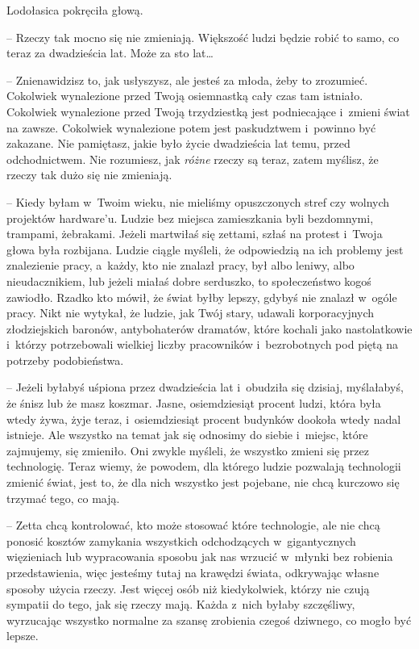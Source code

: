 \documentclass[oneside,polish,11pt,sfheadings]{mwbk}
\begin{document}
Lodołasica pokręciła głową. 

-- Rzeczy tak mocno się nie zmieniają.
Większość ludzi będzie robić to samo, co teraz za dwadzieścia lat. Może
za sto lat\ldots 

-- Znienawidzisz to, jak usłyszysz, ale jesteś za młoda, żeby to
zrozumieć. Cokolwiek wynalezione przed Twoją osiemnastką cały czas tam
istniało. Cokolwiek wynalezione przed Twoją trzydziestką jest
podniecające i~zmieni świat na zawsze. Cokolwiek wynalezione potem jest
paskudztwem i~powinno być zakazane. Nie pamiętasz, jakie było życie
dwadzieścia lat temu, przed odchodnictwem. Nie rozumiesz, jak
\textit{różne} rzeczy są teraz, zatem myślisz, że rzeczy tak dużo się nie
zmieniają.

-- Kiedy byłam w~Twoim wieku, nie mieliśmy opuszczonych stref czy wolnych
projektów hardware'u. Ludzie bez miejsca zamieszkania byli bezdomnymi,
trampami, żebrakami. Jeżeli martwiłaś się zettami, szłaś na protest i~Twoja głowa była rozbijana. Ludzie ciągle myśleli, że odpowiedzią na ich
problemy jest znalezienie pracy, a~każdy, kto nie znalazł pracy, był
albo leniwy, albo nieudacznikiem, lub jeżeli miałaś dobre serduszko, to
społeczeństwo kogoś zawiodło. Rzadko kto mówił, że świat byłby lepszy,
gdybyś nie znalazł w~ogóle pracy. Nikt nie wytykał, że ludzie, jak Twój
stary, udawali korporacyjnych złodziejskich baronów, antybohaterów
dramatów, które kochali jako nastolatkowie i~którzy potrzebowali
wielkiej liczby pracowników i~bezrobotnych pod piętą na potrzeby
podobieństwa.

-- Jeżeli byłabyś uśpiona przez dwadzieścia lat i~obudziła się dzisiaj,
myślałabyś, że śnisz lub że masz koszmar. Jasne, osiemdziesiąt procent
ludzi, która była wtedy żywa, żyje teraz, i~osiemdziesiąt procent
budynków dookoła wtedy nadal istnieje. Ale wszystko na temat jak się
odnosimy do siebie i~miejsc, które zajmujemy, się zmieniło. Oni zwykle
myśleli, że wszystko zmieni się przez technologię. Teraz wiemy, że
powodem, dla którego ludzie pozwalają technologii zmienić świat, jest
to, że dla nich wszystko jest pojebane, nie chcą kurczowo się trzymać
tego, co mają.

-- Zetta chcą kontrolować, kto może stosować które technologie, ale nie
chcą ponosić kosztów zamykania wszystkich odchodzących w~gigantycznych
więzieniach lub wypracowania sposobu jak nas wrzucić w~młynki bez
robienia przedstawienia, więc jesteśmy tutaj na krawędzi świata,
odkrywając własne sposoby użycia rzeczy. Jest więcej osób niż
kiedykolwiek, którzy nie czują sympatii do tego, jak się rzeczy mają.
Każda z~nich byłaby szczęśliwy, wyrzucając wszystko normalne za szansę
zrobienia czegoś dziwnego, co mogło być lepsze.
\end{document}
